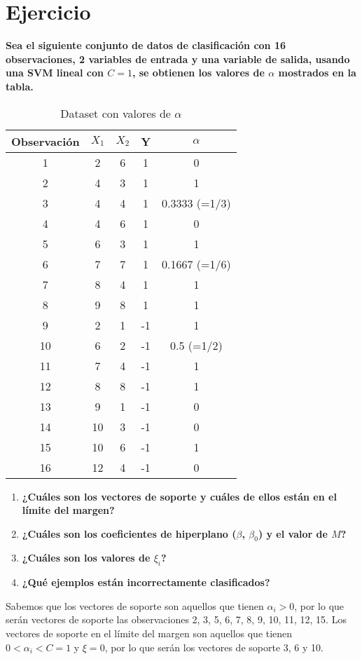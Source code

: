 \section{Ejercicio}
\begin{example}
\textbf{Sea el siguiente conjunto de datos de clasificación con 16 observaciones, 2 variables de entrada y una variable de salida, usando una SVM lineal con $C = 1$, se obtienen los valores de $\alpha$ mostrados en la tabla.}
\begin{table}[H]
\centering
\begin{tabular}{ccccc}
\toprule
Observación & $X_1$ & $X_2$ & Y & $\alpha$ \\
\toprule
1 & 2 & 6 & 1 & 0 \\
2 & 4 & 3 & 1 & 1 \\
3 & 4 & 4 & 1 & 0.3333 (=1/3) \\
4 & 4 & 6 & 1 & 0 \\
5 & 6 & 3 & 1 & 1 \\
6 & 7 & 7 & 1 & 0.1667 (=1/6) \\
7 & 8 & 4 & 1 & 1 \\
8 & 9 & 8 & 1 & 1 \\
9 & 2 & 1 & -1 & 1 \\
10 & 6 & 2 & -1 & 0.5 (=1/2) \\
11 & 7 & 4 & -1 & 1 \\
12 & 8 & 8 & -1 & 1 \\
13 & 9 & 1 & -1 & 0 \\
14 & 10 & 3 & -1 & 0 \\
15 & 10 & 6 & -1 & 1 \\
16 & 12 & 4 & -1 & 0 \\
\toprule
\end{tabular}
\caption{Dataset con valores de $\alpha$}
\label{tab:dataset_alpha}
\end{table}
\begin{enumerate}
\item \textbf{¿Cuáles son los vectores de soporte y cuáles de ellos están en el límite del margen?}
\item \textbf{¿Cuáles son los coeficientes de hiperplano ($\beta$, $\beta_0$) y el valor de $M$?}
\item \textbf{¿Cuáles son los valores de $\xi_i$?}
\item \textbf{¿Qué ejemplos están incorrectamente clasificados?}
\end{enumerate}

Sabemos que los vectores de soporte son aquellos que tienen $\alpha_i > 0$, por lo que serán vectores de soporte las observaciones 2, 3, 5, 6, 7, 8, 9, 10, 11, 12, 15. Los vectores de soporte en el límite del margen son aquellos que tienen $0 < \alpha_i < C=1$ y $\xi = 0$, por lo que serán los vectores de soporte 3, 6 y 10. \\


\end{example}
